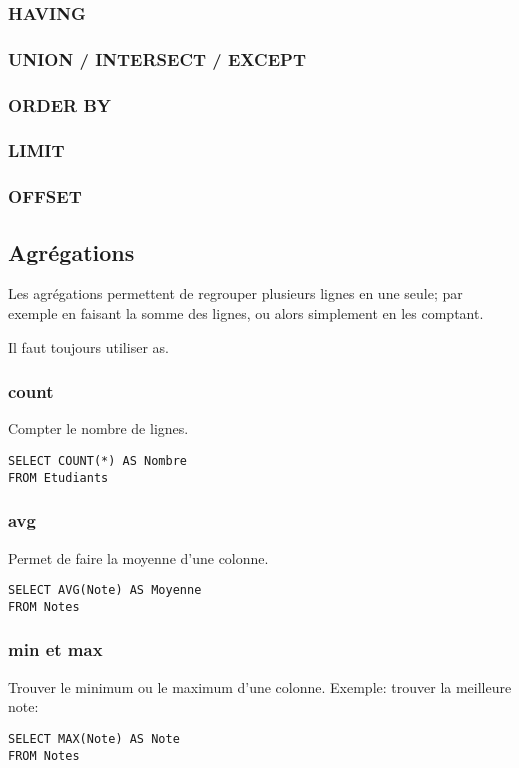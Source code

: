 \documentclass[10pt,a4paper,french]{article}
\begin{document}
\subsubsection{HAVING}

\subsubsection{UNION / INTERSECT / EXCEPT}

\subsubsection{ORDER BY}

\subsubsection{LIMIT}

\subsubsection{OFFSET}

\subsection{Agrégations}

Les agrégations permettent de regrouper plusieurs lignes en une seule; par exemple en faisant la somme des lignes, ou alors simplement en les comptant.

Il faut toujours utiliser \gls{as}.

\subsubsection{\gls{count}}
Compter le nombre de lignes.
\begin{verbatim}
SELECT COUNT(*) AS Nombre
FROM Etudiants
\end{verbatim}

\subsubsection{\gls{avg}}
Permet de faire la moyenne d'une colonne.
\begin{verbatim}
SELECT AVG(Note) AS Moyenne
FROM Notes
\end{verbatim}

\subsubsection{\gls{min} et \gls{max}}
Trouver le minimum ou le maximum d'une colonne. Exemple: trouver la meilleure note:
\begin{verbatim}
SELECT MAX(Note) AS Note
FROM Notes
\end{verbatim}
\end{document}
